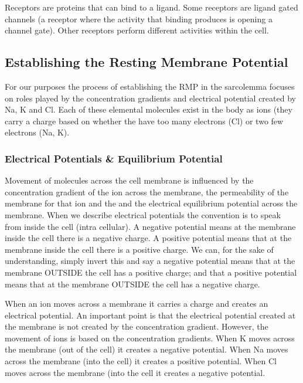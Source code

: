 Receptors are proteins that can bind to a ligand. Some receptors are ligand gated channels (a receptor where the activity that binding produces is opening a channel gate). Other receptors perform different activities within the cell. 


\subsection{Establishing the Resting Membrane Potential}

For our purposes the process of establishing the RMP in the sarcolemma focuses on roles played by the concentration gradients and electrical potential created by Na, K and Cl. Each of these elemental molecules exist in the body as ions (they carry a charge based on whether the have too many electrons (Cl) or two few electrons (Na, K).\footnotemark{} 

\subsubsection{Electrical Potentials \& Equilibrium Potential}

Movement of molecules across the cell membrane is influenced by the concentration gradient of the ion across the membrane, the permeability of the membrane for that ion and the and the electrical equilibrium potential across the membrane. When we describe electrical potentials the convention is to speak from inside the cell (intra cellular). A negative potential means at the membrane inside the cell there is a negative charge. A positive potential means that at the membrane inside the cell there is a positive charge. We can, for the sake of understanding, simply invert this and say a negative potential means that at the membrane OUTSIDE the cell has a positive charge; and that a positive potential means that at the membrane OUTSIDE the cell has a negative charge.

When an ion moves across a membrane it carries a charge and creates an electrical potential. An important point is that the electrical potential created at the membrane is not created by the concentration gradient. However, the movement of ions is based on the concentration gradients.  When K moves across the membrane (out of the cell) it creates a negative potential. When Na moves across the membrane (into the cell) it creates a positive potential. When Cl moves across the membrane (into the cell it creates a negative potential. 

